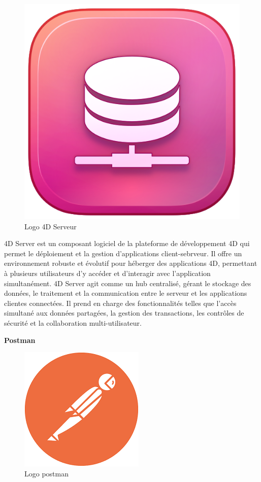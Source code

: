 \begin{figure}[htbp]
   \centering
   \includegraphics[scale=0.2]{Images/4dsrv.png} 
   \caption{Logo 4D Serveur}
   \label{fig:4dsrv}
\end{figure}

4D Server est un composant logiciel de la plateforme de développement 4D qui permet le déploiement et la gestion
d’applications client-sebrveur. Il offre un environnement robuste et évolutif pour héberger des applications 4D, 
permettant à plusieurs utilisateurs d’y accéder et d’interagir avec
l’application simultanément. 4D Server agit comme un hub centralisé, 
gérant le stockage des données, le traitement et la communication entre 
le serveur et les applications clientes connectées. Il prend en charge 
des fonctionnalités telles que l’accès simultané aux données partagées, 
la gestion des transactions, les contrôles de sécurité et la collaboration
multi-utilisateur.
\newline


\large 
\textbf{Postman}

\begin{figure}[htbp]
   \centering
   \includegraphics[scale=0.4]{Images/postman.png} 
   \caption{Logo postman}
   \label{fig:4dsrv}
\end{figure}

